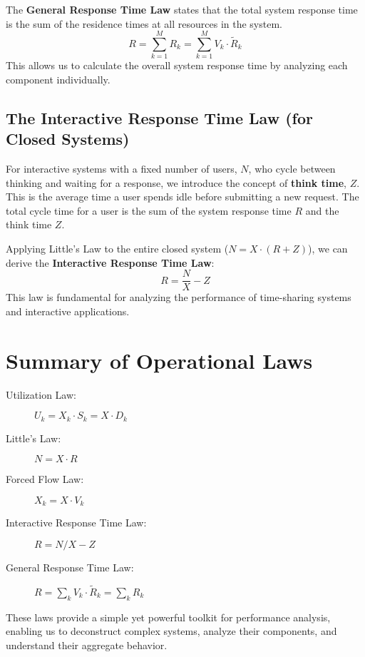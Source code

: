 The \textbf{General Response Time Law} states that the total system response time is the sum of the residence times at all resources in the system.
\begin{equation}
    R = \sum_{k=1}^{M} R_k = \sum_{k=1}^{M} V_k \cdot \tilde{R}_k
\end{equation}
This allows us to calculate the overall system response time by analyzing each component individually.

\subsection{The Interactive Response Time Law (for Closed Systems)}
For interactive systems with a fixed number of users, $N$, who cycle between thinking and waiting for a response, we introduce the concept of \textbf{think time}, $Z$. This is the average time a user spends idle before submitting a new request. The total cycle time for a user is the sum of the system response time $R$ and the think time $Z$.

Applying Little's Law to the entire closed system ($N = X \cdot (R+Z)$), we can derive the \textbf{Interactive Response Time Law}:
\begin{equation}
    R = \frac{N}{X} - Z
\end{equation}
This law is fundamental for analyzing the performance of time-sharing systems and interactive applications.


\section{Summary of Operational Laws}

\begin{description}
    \item[Utilization Law:] $U_k = X_k \cdot S_k = X \cdot D_k$
    \item[Little's Law:] $N = X \cdot R$
    \item[Forced Flow Law:] $X_k = X \cdot V_k$
    \item[Interactive Response Time Law:] $R = N/X - Z$
    \item[General Response Time Law:] $R = \sum_k V_k \cdot \tilde{R}_k = \sum_k R_k$
\end{description}
These laws provide a simple yet powerful toolkit for performance analysis, enabling us to deconstruct complex systems, analyze their components, and understand their aggregate behavior.